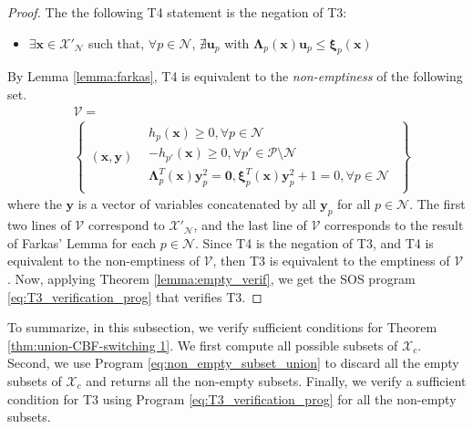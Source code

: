 \documentclass[letterpaper, 10 pt, conference]{ieeeconf}  %
\begin{document}
\begin{proof}
    The the following T4 statement is the negation of T3: 
    \begin{itemize}
        \item[T4: ]$\exists \mathbf{x}\in\mathcal{X}'_{\mathcal{N}}$ such that, $\forall p\in\mathcal{N}$, $\nexists \mathbf{u}_p$ with $\boldsymbol{\Lambda}_p(\mathbf{x})\mathbf{u}_p\leq\boldsymbol{\xi}_p(\mathbf{x})$
    \end{itemize}
    By Lemma \ref{lemma:farkas}, T4 is equivalent to the \textit{non-emptiness} of the following set.
    \begin{align*}
        &\mathcal{V} = \\
        &\left\{
        \begin{array}{l|ll}
        (\mathbf{x},\mathbf{y}) &
        \begin{array}{ll}
        h_p(\mathbf{x})\geq 0, \forall p\in\mathcal{N}\\
        -h_{p'}(\mathbf{x})\geq 0, \forall p'\in\mathcal{P}\setminus\mathcal{N}\\
        \boldsymbol{\Lambda}^T_p(\mathbf{x})\mathbf{y}_p^2 = \mathbf{0},
        \boldsymbol{\xi}^T_p(\mathbf{x})\mathbf{y}_p^2 + 1 = 0, \forall p\in\mathcal{N}
        \end{array}
        \end{array}
        \right\}
    \end{align*}
    where the $\mathbf{y}$ is a vector of variables concatenated by all $\mathbf{y}_p$ for all $p\in\mathcal{N}$. The first two lines of $\mathcal{V}$ correspond to $\mathcal{X}'_{\mathcal{N}}$, and the last line of $\mathcal{V}$ corresponds to the result of Farkas' Lemma for each $p\in\mathcal{N}$. Since T4 is the negation of T3, and T4 is equivalent to the non-emptiness of $\mathcal{V}$, then T3 is equivalent to the emptiness of $\mathcal{V}$. Now, applying Theorem \ref{lemma:empty_verif}, we get the SOS program \eqref{eq:T3_verification_prog} that  verifies T3. 
\end{proof}

To summarize, in this subsection, we verify sufficient conditions for Theorem \ref{thm:union-CBF-switching 1}. We first compute all possible subsets of $\mathcal{X}_c$. Second, we use Program \eqref{eq:non_empty_subset_union} to discard all the empty subsets of $\mathcal{X}_c$ and returns all the non-empty subsets. Finally, we verify a sufficient condition for T3 using Program \eqref{eq:T3_verification_prog} for all the non-empty subsets. 
\end{document}

